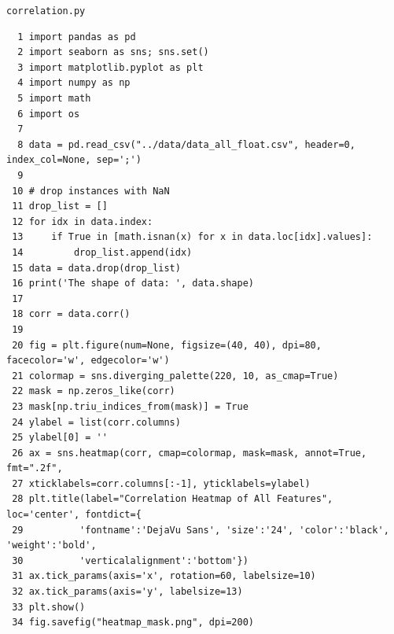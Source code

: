 \documentclass[10pt,aps,prb,amsmath,amssymb,twocolumn,letterpaper,nobalancelastpage,final,citeautoscript,floatfix,raggedbottom,superscriptaddress]{revtex4-1}
\begin{document}
\clearpage
\noindent \texttt{\Large{correlation.py}\label{code:correlation}}\
\begin{lstlisting}
  1 import pandas as pd
  2 import seaborn as sns; sns.set()
  3 import matplotlib.pyplot as plt
  4 import numpy as np
  5 import math
  6 import os
  7 
  8 data = pd.read_csv("../data/data_all_float.csv", header=0, index_col=None, sep=';')
  9 
 10 # drop instances with NaN
 11 drop_list = []
 12 for idx in data.index:
 13     if True in [math.isnan(x) for x in data.loc[idx].values]:
 14         drop_list.append(idx)
 15 data = data.drop(drop_list)
 16 print('The shape of data: ', data.shape)
 17 
 18 corr = data.corr()
 19 
 20 fig = plt.figure(num=None, figsize=(40, 40), dpi=80, facecolor='w', edgecolor='w')
 21 colormap = sns.diverging_palette(220, 10, as_cmap=True)
 22 mask = np.zeros_like(corr)
 23 mask[np.triu_indices_from(mask)] = True
 24 ylabel = list(corr.columns)
 25 ylabel[0] = ''
 26 ax = sns.heatmap(corr, cmap=colormap, mask=mask, annot=True, fmt=".2f",
 27 xticklabels=corr.columns[:-1], yticklabels=ylabel)
 28 plt.title(label="Correlation Heatmap of All Features", loc='center', fontdict={
 29          'fontname':'DejaVu Sans', 'size':'24', 'color':'black', 'weight':'bold',
 30          'verticalalignment':'bottom'})
 31 ax.tick_params(axis='x', rotation=60, labelsize=10)
 32 ax.tick_params(axis='y', labelsize=13)
 33 plt.show()
 34 fig.savefig("heatmap_mask.png", dpi=200)
\end{lstlisting}
\end{document}
